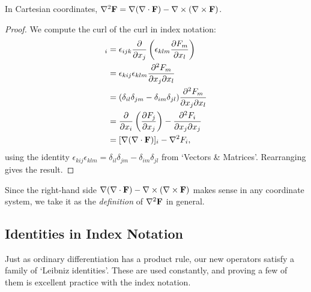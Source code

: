 \documentclass[a4paper]{scrartcl}
\begin{document}
\begin{proposition}
	In Cartesian coordinates, $\nabla^2 \mathbf{F} = \nabla(\nabla \cdot \mathbf{F}) - \nabla \times (\nabla \times \mathbf{F})$.
\end{proposition}
\begin{proof}
	We compute the curl of the curl in index notation:
	\begin{align*}
		[\nabla \times (\nabla \times \vv{F})]_i &= \epsilon_{ijk} \frac{\partial}{\partial x_j} \left(\epsilon_{klm} \frac{\partial F_m}{\partial x_l}\right) \\
		&= \epsilon_{kij}\epsilon_{klm} \frac{\partial^2 F_m}{\partial x_j \partial x_l} \\
		&= (\delta_{il}\delta_{jm} - \delta_{im}\delta_{jl}) \frac{\partial^2 F_m}{\partial x_j \partial x_l} \\
		&= \frac{\partial}{\partial x_i}\left(\frac{\partial F_j}{\partial x_j}\right) - \frac{\partial^2 F_i}{\partial x_j \partial x_j} \\
		&= [\nabla(\nabla \cdot \vv{F})]_i - \nabla^2 F_i,
	\end{align*}
	using the identity $\epsilon_{kij}\epsilon_{klm} = \delta_{il}\delta_{jm} - \delta_{im}\delta_{jl}$ from `Vectors \& Matrices'. Rearranging gives the result.
\end{proof}

Since the right-hand side $\nabla (\nabla \cdot \mathbf{F}) - \nabla \times (\nabla \times \mathbf{F})$ makes sense in any coordinate system, we take it as the \emph{definition} of $\nabla^2 \mathbf{F}$ in general.

\subsection{Identities in Index Notation}

Just as ordinary differentiation has a product rule, our new operators satisfy a family of `Leibniz identities'. These are used constantly, and proving a few of them is excellent practice with the index notation.
\end{document}
